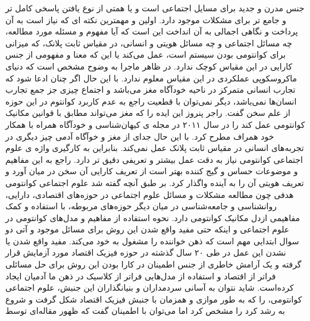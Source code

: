\documentclass[a4paper,titlepage,12pt,fleqn,oneside]{report}
\begin{document}
جنس مدرن و جدید برای مسایل اجتماعی است و یا همتی از نوع یافتن پاسخی کامل تر و جامع تر برای مشکلات موجود دارد. اولین و مهمترین نکته ای که نیاز است به آن پرداخت و نگاهی اجمالی به آن انداخت این است که آیا مفهوم و مسئله مورد مطالعه، چه مسائل اجتماعی و چه مسائل هویتی و انسانی، در مقیاس ثابت پلانک، که میزانی برای کوانتومی بودن سیستم است، عمل می‌کند یا این که معنا و مفهومی از جنس کارایی در این مقیاس کوچک ندارد. در ظاهر ماجرا به وضوح مشخص است که دنیای ماکروسکوپی عملکردی در این مقیاس معلوم ندارد. با این حال اگر چنان ادعا شود که تجارب انسانی متمرکز در ناحیه خودآگاه مغز می‌باشد و اجتماع چیزی جز جمع تجارب انسان‌ها نمی‌باشد، دیگر نمی‌توان با قطعیت راجع به عدم کاربرد کوانتوم در این حوزه از علم سخن گفت. راجر پنروز این ایده را که مغز می‌تواند مطابق با قوانین مکانیک کوانتومی عمل کند\cite{penrose} را در سال ۲۰۱۱ در مجله ی کیهان‌شناسی و خودآگاه همراه با همکار خود همراف مطرح کرد\cite{hamrof}. با این حال جدای از مغز و خوآگاه آدمی چیز دیگری در تجربه‌های انسانی در مقیاس ثابت پلانک عمل نمی‌کند. بنابراین به کارگیری واژه ی علوم اجتماعی کوانتومی نیاز به دقت عمل بیشتر و تعریفی دقیق تر دارد.  
راجع به این مفاهیم و موضوعات حساس و گیج کننده بهتر است از
تعریف کارایی آن سخن در میان آورد و تعریف هویتی آن را به آینده واگذار کرد. بر طبق آنچه گفته شد علوم اجتماعی کوانتومی هدفی چون مطالعه مشکلات و مسائل علوم اجتماعی در حوزه‌های اقتصادی، دارایی، روانشناسی و جامعه‌شناسی در میان دیگر حوزه‌های مربوطه، با استفاده و کمک مفاهیمی ازدل مکانیک کوانتومی دارد. نحوه استفاده از مفاهیم و مدل‌های کوانتومی در علوم اجتماعی و اینکه حتی مفید واقع شدن این روش برای مسائل موجود و آتی دو سوال ابتدایی مهم است که ذهن خواننده را مشغول به خود می‌کند. مفید واقع شدن یا نشدن این عمل در طی ۲۰ سال گذشته در حوزه فیزیک اقتصاد مورد آزمایش قرار گرفته و یک آرامش خاطری از جنس اطمینان در کارا بودن این روش برای حل مسائلی فراتر از اقتصاد و استفاده از مدل‌هایی فراتر از کلاسیک در ذهن ما آدمیان ایجاد کرده‌است. شاید نتوان به آسانی سردمداران و بنیانگذاران این جنبش، علوم اجتماعی کوانتومی، را که به طور موازی و همزمان با جنبش فیزیک اقتصاد شکل گرفت و شروع به رشد کرد را مشخص کرد اما می‌توان با اطمینان گفت که ظهور مقاله‌ای\cite{kh2} توسط 
\end{document}
